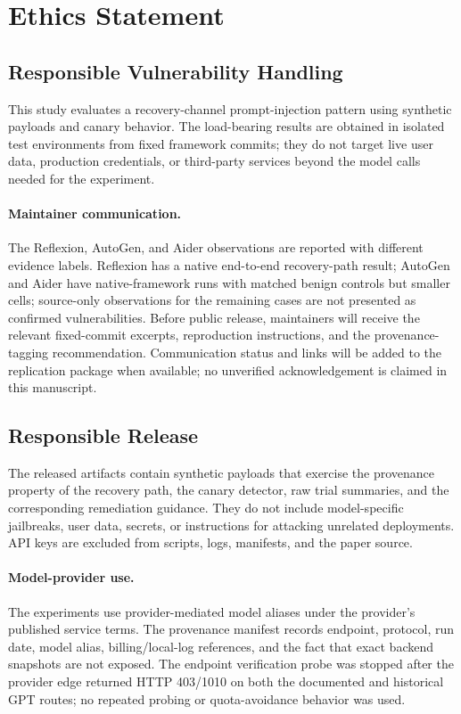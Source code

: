 
\section{Ethics Statement}
\label{sec:ethics}

\subsection{Responsible Vulnerability Handling}

This study evaluates a recovery-channel prompt-injection pattern using
synthetic payloads and canary behavior.  The load-bearing results are obtained
in isolated test environments from fixed framework commits; they do not
target live user data, production credentials, or third-party services beyond
the model calls needed for the experiment.

\paragraph{Maintainer communication.}
The Reflexion, AutoGen, and Aider observations are reported with different
evidence labels.  Reflexion has a native end-to-end recovery-path result;
AutoGen and Aider have native-framework runs with matched benign controls but
smaller cells; source-only observations for the remaining cases are not
presented as confirmed vulnerabilities.  Before public release, maintainers
will receive the relevant fixed-commit excerpts, reproduction instructions,
and the provenance-tagging recommendation.  Communication status and links
will be added to the replication package when available; no unverified
acknowledgement is claimed in this manuscript.

\subsection{Responsible Release}

The released artifacts contain synthetic payloads that exercise the
provenance property of the recovery path, the canary detector, raw trial
summaries, and the corresponding remediation guidance.  They do not include
model-specific jailbreaks, user data, secrets, or instructions for attacking
unrelated deployments.  API keys are excluded from scripts, logs, manifests,
and the paper source.

\paragraph{Model-provider use.}
The experiments use provider-mediated model aliases under the provider's
published service terms.  The provenance manifest records endpoint, protocol,
run date, model alias, billing/local-log references, and the fact that exact
backend snapshots are not exposed.  The endpoint verification probe was
stopped after the provider edge returned HTTP 403/1010 on both the documented
and historical GPT routes; no repeated probing or quota-avoidance behavior was
used.

